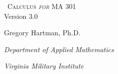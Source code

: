 
\begin{minipage}{\textwidth}
\begin{flushright}

\textsc{\large \apex\ {\Huge Calculus \textit{for} MA 301}} \\

{\small Version 3.0}\\

\Large
\vspace{1in}

Gregory Hartman, Ph.D.

\emph{\small Department of Applied Mathematics}

\emph{\small Virginia Military Institute}\vskip15pt



\normalsize
\end{flushright}
\end{minipage}

